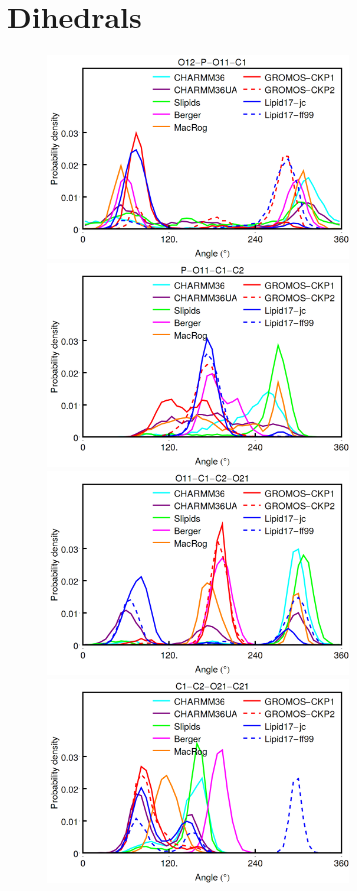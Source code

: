 \documentclass[aps,prl,superscriptaddress,twocolumn]{revtex4}
\begin{document}
\section{Dihedrals}
\begin{figure}[]
  \centering
  \includegraphics[width=8.0cm]{../Figs/diheds_pops1.png}
  \includegraphics[width=8.0cm]{../Figs/diheds_pops2.png}
  \includegraphics[width=8.0cm]{../Figs/diheds_pops3.png}
  \includegraphics[width=8.0cm]{../Figs/diheds_pops4.png}

\end{figure}
\end{document}
